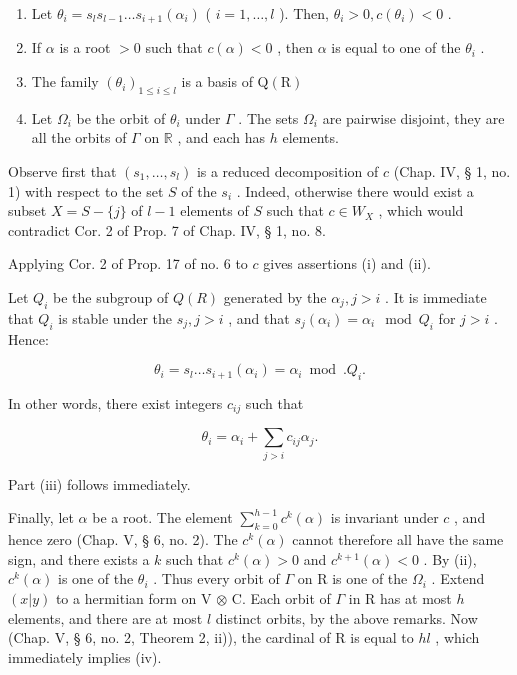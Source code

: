 \begin{enumerate}
\def\labelenumi{(\roman{enumi})}
\item
  Let \(\theta_{i} = s_{l}s_{l - 1}\dots s_{i + 1}(\alpha_{i})\) ( \(i = 1,\dots ,l\) ). Then, \(\theta_{i} > 0,c(\theta_{i}) < 0\) .
\item
  If \(\alpha\) is a root \(>0\) such that \(c(\alpha) < 0\) , then \(\alpha\) is equal to one of the \(\theta_{i}\) .
\item
  The family \((\theta_{i})_{1\leqslant i\leqslant l}\) is a basis of \(\mathrm{Q}(\mathrm{R})\)
\item
  Let \(\Omega_{i}\) be the orbit of \(\theta_{i}\) under \(\Gamma\) . The sets \(\Omega_{i}\) are pairwise disjoint, they are all the orbits of \(\Gamma\) on \(\mathbb{R}\) , and each has \(h\) elements.
\end{enumerate}

Observe first that \((s_1, \ldots, s_l)\) is a reduced decomposition of \(c\) (Chap. IV, § 1, no. 1) with respect to the set \(S\) of the \(s_i\) . Indeed, otherwise there would exist a subset \(X = S - \{j\}\) of \(l - 1\) elements of \(S\) such that \(c \in W_X\) , which would contradict Cor. 2 of Prop. 7 of Chap. IV, § 1, no. 8.

Applying Cor. 2 of Prop. 17 of no. 6 to \(c\) gives assertions (i) and (ii).

Let \(Q_{i}\) be the subgroup of \(Q(R)\) generated by the \(\alpha_{j}, j > i\) . It is immediate that \(Q_{i}\) is stable under the \(s_{j}, j > i\) , and that \(s_{j}(\alpha_{i}) = \alpha_{i} \mod Q_{i}\) for \(j > i\) . Hence:

\[
\theta_ {i} = s _ {l} \dots s _ {i + 1} (\alpha_ {i}) = \alpha_ {i} \bmod . Q _ {i}.
\]

In other words, there exist integers \(c_{ij}\) such that

\[
\theta_ {i} = \alpha_ {i} + \sum_ {j > i} c _ {i j} \alpha_ {j}.
\]

Part (iii) follows immediately.

Finally, let \(\alpha\) be a root. The element \(\sum_{k=0}^{h-1} c^k(\alpha)\) is invariant under \(c\) , and hence zero (Chap. V, § 6, no. 2). The \(c^k(\alpha)\) cannot therefore all have the same sign, and there exists a \(k\) such that \(c^k(\alpha) > 0\) and \(c^{k+1}(\alpha) < 0\) . By (ii), \(c^k(\alpha)\) is one of the \(\theta_i\) . Thus every orbit of \(\Gamma\) on R is one of the \(\Omega_i\) . Extend \((x|y)\) to a hermitian form on V \(\otimes\) C. Each orbit of \(\Gamma\) in R has at most \(h\) elements, and there are at most \(l\) distinct orbits, by the above remarks. Now (Chap. V, § 6, no. 2, Theorem 2, ii)), the cardinal of R is equal to \(hl\) , which immediately implies (iv).
\relax{}
